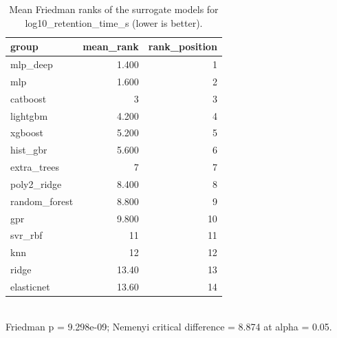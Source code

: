 \begin{table}[!t]
\centering
\caption{Mean Friedman ranks of the surrogate models for log10_retention_time_s (lower is better).}
\label{tab:statistics_surrogate_ranks_surrogate_log10_retention_time_s}
\footnotesize
\begin{tabular}{lrr}
\toprule
group & mean\_rank & rank\_position \\
\midrule
mlp\_deep & 1.400 & 1 \\
mlp & 1.600 & 2 \\
catboost & 3 & 3 \\
lightgbm & 4.200 & 4 \\
xgboost & 5.200 & 5 \\
hist\_gbr & 5.600 & 6 \\
extra\_trees & 7 & 7 \\
poly2\_ridge & 8.400 & 8 \\
random\_forest & 8.800 & 9 \\
gpr & 9.800 & 10 \\
svr\_rbf & 11 & 11 \\
knn & 12 & 12 \\
ridge & 13.40 & 13 \\
elasticnet & 13.60 & 14 \\
\bottomrule
\end{tabular}
\\[2pt] \footnotesize Friedman p = 9.298e-09; Nemenyi critical difference = 8.874 at alpha = 0.05.
\end{table}
